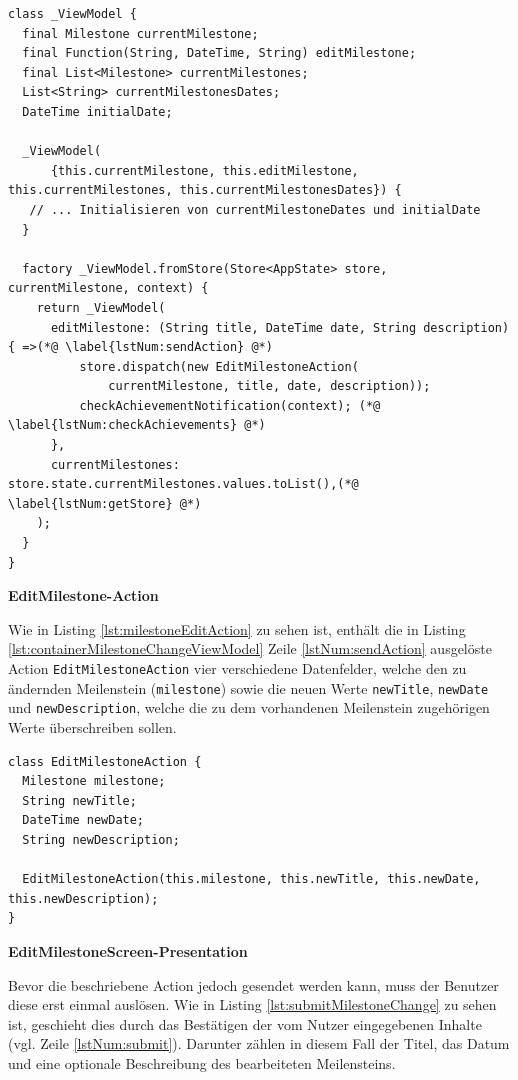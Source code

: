 \documentclass[bibliography=totoc,listof=totoc,BCOR=5mm,DIV=12,oneside]{scrbook}
\begin{document}
\bigskip
\begin{lstlisting}[caption={ViewModel von Container-Komponente einer Meilensteinänderung},captionpos=b, label=lst:containerMilestoneChangeViewModel]
class _ViewModel {
  final Milestone currentMilestone;
  final Function(String, DateTime, String) editMilestone;
  final List<Milestone> currentMilestones;
  List<String> currentMilestonesDates;
  DateTime initialDate;

  _ViewModel(
      {this.currentMilestone, this.editMilestone, this.currentMilestones, this.currentMilestonesDates}) {
   // ... Initialisieren von currentMilestoneDates und initialDate
  }
  
  factory _ViewModel.fromStore(Store<AppState> store, currentMilestone, context) {
    return _ViewModel(
      editMilestone: (String title, DateTime date, String description) { =>(*@ \label{lstNum:sendAction} @*)
          store.dispatch(new EditMilestoneAction(
              currentMilestone, title, date, description));
          checkAchievementNotification(context); (*@ \label{lstNum:checkAchievements} @*)
      },
      currentMilestones: store.state.currentMilestones.values.toList(),(*@ \label{lstNum:getStore} @*)
    );
  }
}
\end{lstlisting}

\par \bigskip \textbf{EditMilestone-Action}
\par Wie in Listing \ref{lst:milestoneEditAction} zu sehen ist, enthält die in Listing \ref{lst:containerMilestoneChangeViewModel} Zeile \ref{lstNum:sendAction} ausgelöste Action \texttt{EditMilestoneAction} vier verschiedene Datenfelder, welche 
den zu ändernden Meilenstein (\texttt{milestone}) sowie die neuen Werte \texttt{newTitle}, \texttt{newDate} und \texttt{newDescription}, welche die zu dem vorhandenen Meilenstein zugehörigen Werte überschreiben sollen.

\bigskip
\begin{lstlisting}[caption={Meilenstein Action Beispiel},captionpos=b, label=lst:milestoneEditAction]
class EditMilestoneAction {
  Milestone milestone;
  String newTitle;
  DateTime newDate;
  String newDescription;

  EditMilestoneAction(this.milestone, this.newTitle, this.newDate, this.newDescription);
}
\end{lstlisting}
\bigskip

\newpage

\par \bigskip \textbf{EditMilestoneScreen-Presentation}
\par Bevor die beschriebene Action jedoch gesendet werden kann, muss der Benutzer diese erst einmal auslösen. Wie in Listing \ref{lst:submitMilestoneChange} zu sehen ist, geschieht dies durch das Bestätigen der vom Nutzer eingegebenen Inhalte (vgl. Zeile \ref{lstNum:submit}). Darunter zählen in diesem Fall der Titel, das Datum und eine optionale Beschreibung des bearbeiteten Meilensteins.
\end{document}
